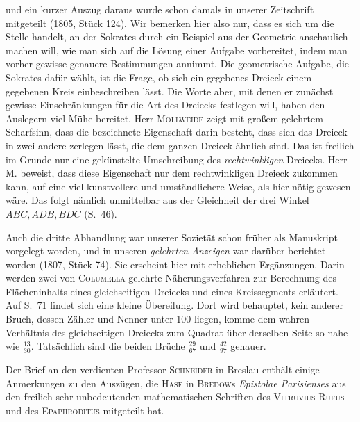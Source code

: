 %
und ein kurzer Auszug daraus wurde schon damals in unserer Zeitschrift mitgeteilt (1805, Stück 124). Wir bemerken hier also nur, dass es sich um die Stelle handelt, an der Sokrates durch ein Beispiel aus der Geometrie anschaulich machen will, wie man sich auf die Lösung einer Aufgabe vorbereitet, indem man vorher gewisse genauere Bestimmungen annimmt. Die geometrische Aufgabe, die Sokrates dafür wählt, ist die Frage, ob sich ein gegebenes Dreieck einem gegebenen Kreis einbeschreiben lässt. Die Worte aber, mit denen er zunächst gewisse Einschränkungen für die Art des Dreiecks festlegen will, haben den Auslegern viel Mühe bereitet. Herr \textsc{Mollweide} zeigt mit großem gelehrtem Scharfsinn, dass die bezeichnete Eigenschaft darin besteht, dass sich das Dreieck in zwei andere zerlegen lässt, die dem ganzen Dreieck ähnlich sind. Das ist freilich im Grunde nur eine gekünstelte Umschreibung des \textit{rechtwinkligen} Dreiecks. Herr M. beweist, dass diese Eigenschaft nur dem rechtwinkligen Dreieck zukommen kann, auf eine viel kunstvollere und umständlichere Weise, als hier nötig gewesen wäre. Das folgt nämlich unmittelbar aus der Gleichheit der drei Winkel \(ABC,ADB,BDC\) (S.~46).

Auch die dritte Abhandlung war unserer Sozietät schon früher als Manuskript vorgelegt worden, und in unseren \textit{gelehrten Anzeigen} war darüber berichtet worden (1807, Stück 74). Sie erscheint hier mit erheblichen Ergänzungen. Darin werden zwei von \textsc{Columella} gelehrte Näherungsverfahren zur Berechnung des Flächeninhalts eines gleichseitigen Dreiecks und eines Kreissegments erläutert. Auf S.~71 findet sich eine kleine Übereilung. Dort wird behauptet, kein anderer Bruch, dessen Zähler und Nenner unter 100 liegen, komme dem wahren Verhältnis des gleichseitigen Dreiecks zum Quadrat über derselben Seite so nahe wie \(\frac{13}{30}\). Tatsächlich sind die beiden Brüche \(\frac{29}{67}\) und \(\frac{42}{97}\) genauer.

Der Brief an den verdienten Professor \textsc{Schneider} in Breslau enthält einige Anmerkungen zu den Auszügen, die \textsc{Hase} in \textsc{Bredow}s \textit{Epistolae Parisienses} aus den freilich sehr unbedeutenden mathematischen Schriften des \textsc{Vitruvius Rufus} und des \textsc{Epaphroditus} mitgeteilt hat.

